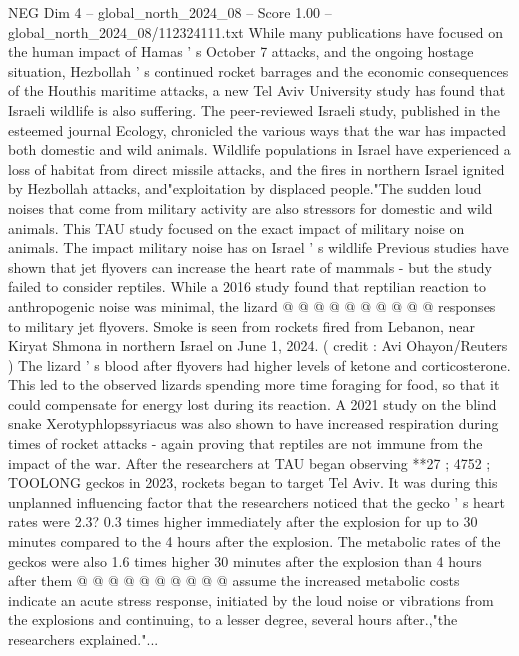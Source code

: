 \begin{textsample}{NEG Dim 4 – global\_north\_2024\_08 – Score 1.00 – global\_north\_2024\_08/112324111.txt}  \label{ex:f4_neg_302}
While many publications have focused on the human impact of Hamas ' s October 7 attacks, and the ongoing hostage situation, Hezbollah ' s continued rocket barrages and the economic consequences of the Houthis maritime attacks, a new Tel Aviv University study has found that Israeli wildlife is also suffering.
The peer-reviewed Israeli study, published in the esteemed journal Ecology, chronicled the various ways that the war has impacted both domestic and wild animals.
Wildlife populations in Israel have experienced a loss of habitat from direct missile attacks, and the fires in northern Israel ignited by Hezbollah attacks, and"exploitation by displaced people."The sudden loud noises that come from military activity are also stressors for domestic and wild animals.
This TAU study focused on the exact impact of military noise on animals.
The impact military noise has on Israel ' s wildlife Previous studies have shown that jet flyovers can increase the heart rate of mammals - but the study failed to consider reptiles.
While a 2016 study found that reptilian reaction to anthropogenic noise was minimal, the lizard @ @ @ @ @ @ @ @ @ @ responses to military jet flyovers.
Smoke is seen from rockets fired from Lebanon, near Kiryat Shmona in northern Israel on June 1, 2024. ( credit : Avi Ohayon/Reuters ) The lizard ' s blood after flyovers had higher levels of ketone and corticosterone.
This led to the observed lizards spending more time foraging for food, so that it could compensate for energy lost during its reaction.
A 2021 study on the blind snake Xerotyphlopssyriacus was also shown to have increased respiration during times of rocket attacks - again proving that reptiles are not immune from the impact of the war.
After the researchers at TAU began observing **27 ; 4752 ; TOOLONG geckos in 2023, rockets began to target Tel Aviv.
It was during this unplanned influencing factor that the researchers noticed that the gecko ' s heart rates were 2.3? 0.3 times higher immediately after the explosion for up to 30 minutes compared to the 4 hours after the explosion.
The metabolic rates of the geckos were also 1.6 times higher 30 minutes after the explosion than 4 hours after them @ @ @ @ @ @ @ @ @ @ assume the increased metabolic costs indicate an acute stress response, initiated by the loud noise or vibrations from the explosions and continuing, to a lesser degree, several hours after.,"the researchers explained."...

\end{textsample}
